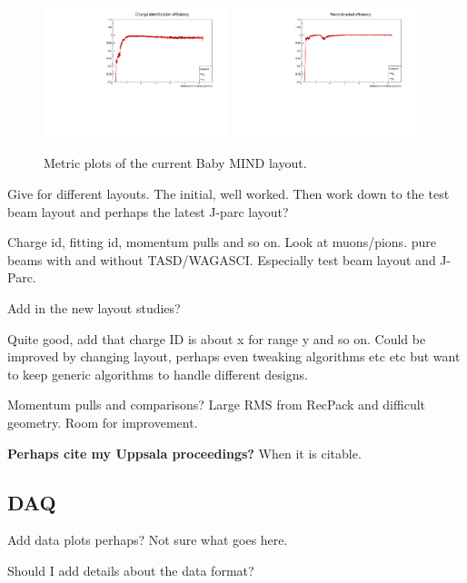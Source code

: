 \begin{figure}[h!]
\centering
\includegraphics[width=0.48\textwidth]{figures/oldStudies/FullChargeID.pdf}
\includegraphics[width=0.48\textwidth]{figures/oldStudies/FullFitted.pdf}
\caption{Metric plots of the current Baby MIND layout.}
\label{fig:TestBeamMIND2}
\end{figure}

Give for different layouts. The initial, well worked. Then work down to the test beam layout and perhaps the latest J-parc layout? 

Charge id, fitting id, momentum pulls and so on.
Look at muons/pions. pure beams with and without TASD/WAGASCI. Especially test beam layout and J-Parc.

Add in the new layout studies?

Quite good, add that charge ID is about x for range y and so on.  Could be improved by changing layout, perhaps even tweaking algorithms etc etc but want to keep generic algorithms to handle different designs.

Momentum pulls and comparisons? Large RMS from RecPack and difficult geometry. Room for improvement.

\textbf{Perhaps cite my Uppsala proceedings?} When it is citable.

\subsection{DAQ}
Add data plots perhaps? Not sure what goes here.

Should I add details about the data format?


